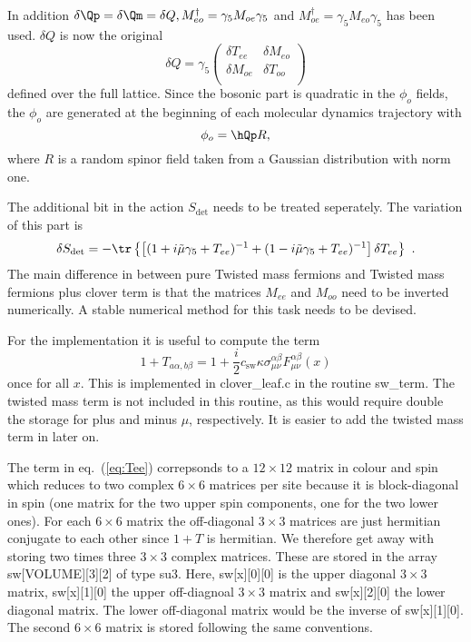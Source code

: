 In addition $\delta\Qp = \delta\Qm = \delta Q, M_{eo}^\dagger =
\gamma_5 M_{oe}\gamma_5$ and $M_{oe}^\dagger = \gamma_5
M_{eo}\gamma_5$ has been used.  $\delta Q$
is now the original
\[
\delta Q = \gamma_5
\begin{pmatrix}
  \delta T_{ee} & \delta M_{eo} \\
  \delta M_{oe} & \delta T_{oo} \\
\end{pmatrix}
\]
defined over the full lattice. Since the bosonic part
is quadratic in the $\phi_o$ fields, the $\phi_o$ are generated at the
beginning of each molecular dynamics trajectory with
\begin{equation}
  \label{eq:eosw10}
  \phi_o = \hQp R,
\end{equation}
where $R$ is a random spinor field taken from a Gaussian distribution
with norm one.

The additional bit in the action $S_{\det}$ needs to be treated
seperately. The variation of this part is
\begin{equation}
  \label{eq:eosw11}
  \delta S_{\det} = -\tr \left\{ \left[(1+i\tilde\mu\gamma_5 + T_{ee})^{-1}  +
    (1-i\tilde\mu\gamma_5 + T_{ee})^{-1}\right] \delta T_{ee} \right\} \ . 
\end{equation}
The main difference in between pure Twisted mass fermions and Twisted
mass fermions plus clover term is that the matrices $M_{ee}$ and
$M_{oo}$ need to be inverted numerically. A stable numerical method
for this task needs to be devised.

For the implementation it is useful to compute the term
\begin{equation}
  \label{eq:Tee}
  1+T_{a\alpha,b\beta} = 1 + \frac{i}{2} c_\mathrm{sw}
  \kappa\sigma_{\mu\nu}^{\alpha\beta}F_{\mu\nu}^{\alpha\beta}(x)
\end{equation}  
once for all $x$. This is implemented in {\ttfamily clover\_leaf.c} in
the routine {\ttfamily sw\_term}. The twisted mass term is not
included in this routine, as this would require double the storage for
plus and minus $\mu$, respectively. It is easier to add the twisted
mass term in later on. 

The term in eq.~(\ref{eq:Tee}) correpsonds to a $12\times12$ matrix
in colour and spin which reduces to two complex $6\times6$ matrices
per site because it is block-diagonal in spin (one matrix for the two
upper spin components, one for the two lower ones). 
For each $6\times6$ matrix the off-diagonal $3\times3$
matrices are just hermitian conjugate to each other since $1+T$ is hermitian.
We therefore get away with storing two times three 
$3\times3$ complex matrices. These are stored in the array {\ttfamily
  sw[VOLUME][3][2]} of type {\ttfamily su3}. Here, {\ttfamily
  sw[x][0][0]} is the upper diagonal $3\times3$ matrix, {\ttfamily
  sw[x][1][0]} the upper off-diagnoal $3\times3$ matrix and {\ttfamily
  sw[x][2][0]} the lower diagonal matrix. The lower off-diagonal
matrix would be the inverse of {\ttfamily sw[x][1][0]}. The second
$6\times6$ matrix is stored following the same conventions.


